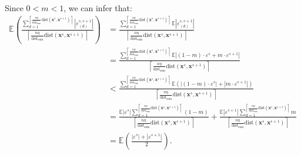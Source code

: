 \documentclass[final,3p,times]{elsarticle}
\begin{document}
Since $0<m<1$, we can infer that:
\begin{equation*}
\begin{aligned}
\mathbb{E}(\frac{\textstyle\sum_{d=1}^{{\left\lceil 
\frac{n\eta }{\text{dist}_{\text{sum}}}\text{dist}
(\boldsymbol{x}^s,\boldsymbol{x}^{s+1})\right\rceil}}
{|\varepsilon^{s,s+1}_{(d)}|}}{\left\lceil \frac{n\eta }
{\text{dist}_{\text{sum}}}\text{dist}(\boldsymbol{x}^s,
\boldsymbol{x}^{s+1})\right\rceil}) 
&=\frac{\textstyle\sum_{d=1}^{{\left\lceil \frac{n\eta }
{\text{dist}_{\text{sum}}}\text{dist}(\boldsymbol{x}^s,
\boldsymbol{x}^{s+1})\right\rceil}}{\mathbb{E}|\varepsilon
^{s,s+1}_{(d)}|}}{\left\lceil \frac{n\eta }{\text{dist}
_{\text{sum}}}\text{dist}(\boldsymbol{x}^s,\boldsymbol{x}
^{s+1})\right\rceil}\\
&=\frac{\textstyle\sum_{d=1}^{{\left\lceil \frac{n\eta }
{\text{dist}_{\text{sum}}}\text{dist}(\boldsymbol{x}^s,
\boldsymbol{x}^{s+1})\right\rceil}}{\mathbb{E}|(1-m)
\cdot\varepsilon^s+m\cdot\varepsilon^{s+1}|}}{\left\lceil 
\frac{n\eta }{\text{dist}_{\text{sum}}}\text{dist}
(\boldsymbol{x}^s,\boldsymbol{x}^{s+1})\right\rceil}\\
&<\frac{\textstyle\sum_{d=1}^{{\left\lceil \frac{n\eta }
{\text{dist}_{\text{sum}}}\text{dist}(\boldsymbol{x}^s,
\boldsymbol{x}^{s+1})\right\rceil}}{\mathbb{E}(|(1-m)
\cdot\varepsilon^s|+|m\cdot\varepsilon^{s+1}|)}}
{\left\lceil \frac{n\eta }{\text{dist}_{\text{sum}}}
\text{dist}(\boldsymbol{x}^s,\boldsymbol{x}^{s+1})\right
\rceil}\\
&=\frac{\mathbb{E}|\varepsilon^s|\textstyle\sum_{d=1}^
{{\left\lceil \frac{n\eta }{\text{dist}_{\text{sum}}}
\text{dist}(\boldsymbol{x}^s,\boldsymbol{x}^{s+1})\right\rceil}}
{(1-m)}}{\left\lceil \frac{n\eta }{\text{dist}_{
\text{sum}}}\text{dist}(\boldsymbol{x}^s,\boldsymbol{x}
^{s+1})\right\rceil} + \frac{{\mathbb{E}|\varepsilon^{s+1}|}\textstyle\sum_
{d=1}^{\left\lceil \frac{n\eta}{\text{dist}_{\text{sum}}}
\text{dist}(\boldsymbol{x}^s,\boldsymbol{x}^{s+1})\right\rceil}m}
{\left\lceil \frac{n\eta }{\text{dist}_{\text{sum}}}
\text{dist}(\boldsymbol{x}^s,\boldsymbol{x}^{s+1})\right\rceil}\\
&=\mathbb{E}(\frac{|\varepsilon^s|+|\varepsilon^{s+1}|}
{2}).
\end{aligned}
\end{equation*}



  
 

\end{document}
